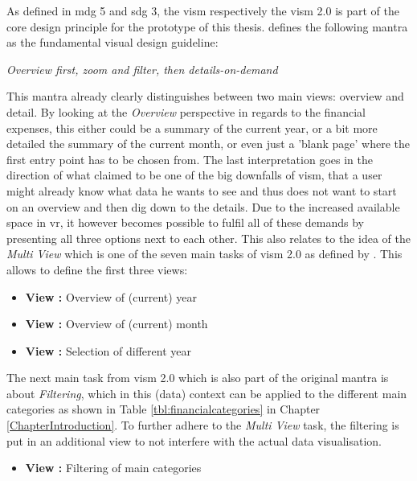 As defined in \gls{mdg} 5 and \gls{sdg} 3, the \gls{vism} respectively the \gls{vism} 2.0 is part of the core design principle for the prototype of this thesis. \cite{Shneiderman1996} defines the following mantra as the fundamental visual design guideline:
\begin{framed}
	\textit{Overview first, zoom and filter, then details-on-demand}
\end{framed}
This mantra already clearly distinguishes between two main views: overview and detail. By looking at the \textit{Overview} perspective in regards to the financial expenses, this either could be a summary of the current year, or a bit more detailed the summary of the current month, or even just a 'blank page' where the first entry point has to be chosen from. The last interpretation goes in the direction of what \cite{Neil2006} claimed to be one of the big downfalls of \gls{vism}, that a user might already know what data he wants to see and thus does not want to start on an overview and then dig down to the details. Due to the increased available space in \gls{vr}, it however becomes possible to fulfil all of these demands by presenting all three options next to each other. This also relates to the idea of the \textit{Multi View} which is one of the seven main tasks of \gls{vism} 2.0 as defined by \cite{Stauffer2016}. This allows to define the first three views:
\begin{itemize}[noitemsep,nolistsep]
	\item \textbf{View :} Overview of (current) year
	\item \textbf{View :} Overview of (current) month
	\item \textbf{View :} Selection of different year
\end{itemize}
The next main task from \gls{vism} 2.0 which is also part of the original mantra is about \textit{Filtering}, which in this (data) context can be applied to the different main categories as shown in Table \ref{tbl:financialcategories} in Chapter \ref{ChapterIntroduction}. To further adhere to the \textit{Multi View} task, the filtering is put in an additional view to not interfere with the actual data visualisation.
\begin{itemize}[noitemsep,nolistsep]
	\item \textbf{View :} Filtering of main categories
\end{itemize}

